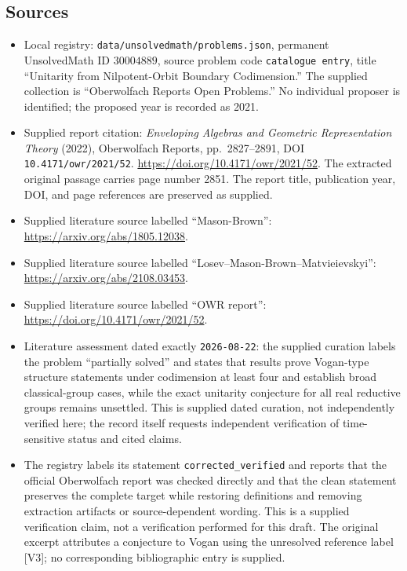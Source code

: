 \documentclass[11pt]{article}
\begin{document}
\subsection{Sources}
\begin{itemize}
\item Local registry: \texttt{data/unsolvedmath/problems.json}, permanent UnsolvedMath ID \(30004889\), source problem code \texttt{catalogue entry}, title ``Unitarity from Nilpotent-Orbit Boundary Codimension.'' The supplied collection is ``Oberwolfach Reports Open Problems.'' No individual proposer is identified; the proposed year is recorded as 2021.
\item Supplied report citation: \emph{Enveloping Algebras and Geometric Representation Theory} (2022), Oberwolfach Reports, pp.\ 2827--2891, DOI \texttt{10.4171/owr/2021/52}. \url{https://doi.org/10.4171/owr/2021/52}. The extracted original passage carries page number 2851. The report title, publication year, DOI, and page references are preserved as supplied.
\item Supplied literature source labelled ``Mason-Brown'': \url{https://arxiv.org/abs/1805.12038}.
\item Supplied literature source labelled ``Losev--Mason-Brown--Matvieievskyi'': \url{https://arxiv.org/abs/2108.03453}.
\item Supplied literature source labelled ``OWR report'': \url{https://doi.org/10.4171/owr/2021/52}.
\item Literature assessment dated exactly \texttt{2026-08-22}: the supplied curation labels the problem ``partially solved'' and states that results prove Vogan-type structure statements under codimension at least four and establish broad classical-group cases, while the exact unitarity conjecture for all real reductive groups remains unsettled. This is supplied dated curation, not independently verified here; the record itself requests independent verification of time-sensitive status and cited claims.
\item The registry labels its statement \texttt{corrected\_verified} and reports that the official Oberwolfach report was checked directly and that the clean statement preserves the complete target while restoring definitions and removing extraction artifacts or source-dependent wording. This is a supplied verification claim, not a verification performed for this draft. The original excerpt attributes a conjecture to Vogan using the unresolved reference label [V3]; no corresponding bibliographic entry is supplied.
\end{itemize}
\end{document}
